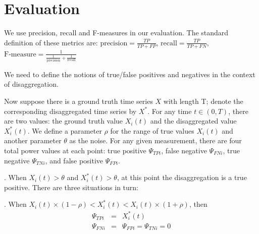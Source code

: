 %
\section{Evaluation}
%
%
We use precision, recall and F-measures in our evaluation. The standard
definition of these metrics are:
$\textrm{precision}=\frac{TP}{TP+FP}$,
$\textrm{recall}=\frac{TP}{TP+FN}$,
$\textrm{F-measure}=\frac{1}{\frac{1}{\textrm{precision}}+\frac{1}{\textrm{recall}}}$

We need to define the notions of true/false positives
and negatives in the context of disaggregation.

Now suppose there is a ground truth time series $X$ with length T;
denote the corresponding disaggregated time series by $X^*$.
For any time $t \in (0, T)$, there are two values: the
ground truth value $X_i(t)$ and the disaggregated value
$X_i^*(t)$. We define a parameter $\rho$ for the range of
true values $X_i(t)$ and another parameter $\theta$
as the noise.
For any given measurement,
there are four total power values at
each point: true positive $\Psi_{TPi}$,  false negative $\Psi_{FNi}$,
true negative $\Psi_{TNi}$, and false positive $\Psi_{FPi}$.

. When $X_i(t) > \theta$ and  $X_i^*(t)> \theta  $,
at this point the disaggregation is a true positive.
There are three situations in turn:

. When $  X_i(t) \times (1-\rho) <  X_i^*(t) <  X_i(t) \times (1+\rho)  $, then
\begin{eqnarray*}
 {\Psi}_{TPi} &=& X_i^*(t) \\
 \Psi_{FNi}&=&\Psi_{FPi} =\Psi_{TNi}=0
\end{eqnarray*}

